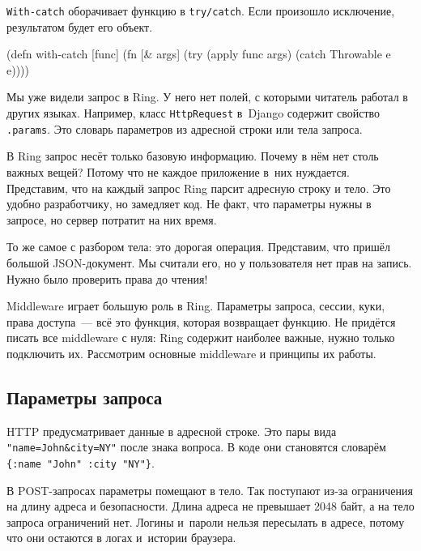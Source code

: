 
\verb|With-catch| оборачивает функцию в \verb|try/catch|. Если произошло
исключение, результатом будет его объект.

\begin{english}
  \begin{clojure}
(defn with-catch [func]
  (fn [& args]
    (try
      (apply func args)
      (catch Throwable e
        e))))
  \end{clojure}
\end{english}


Мы уже видели запрос в Ring. У него нет полей, с которыми читатель работал в
других языках. Например, класс \verb|HttpRequest| в~Django содержит свойство
\verb|.params|. Это словарь параметров из адресной строки или тела запроса.

В Ring запрос несёт только базовую информацию. Почему в нём нет столь
важных вещей? Потому что не каждое приложение в~них нуждается. Представим, что
на каждый запрос Ring парсит адресную строку и тело. Это удобно разработчику, но
замедляет код. Не факт, что параметры нужны в запросе, но сервер потратит на них
время.

То же самое с разбором тела: это дорогая операция. Представим, что пришёл
большой JSON-документ. Мы считали его, но у пользователя нет прав на
запись. Нужно было проверить права до чтения!

Middleware играет большую роль в Ring. Параметры запроса, сессии, куки, права
доступа~--- всё это функция, которая возвращает функцию. Не придётся писать
все middleware с нуля: Ring содержит наиболее важные, нужно только подключить
их. Рассмотрим основные middleware и принципы их работы.

\subsection{Параметры запроса}

\label{ring-params}


HTTP предусматривает данные в адресной строке. Это пары вида
\verb|"name=John&city=NY"| после знака вопроса. В коде они становятся
словарём \verb|{:name "John" :city "NY"}|.

В POST-запросах параметры помещают в тело. Так поступают из-за ограничения на
длину адреса и безопасности. Длина адреса не превышает 2048 байт, а на тело
запроса ограничений нет. Логины и~пароли нельзя пересылать в адресе, потому что
они остаются в логах и~истории браузера.

